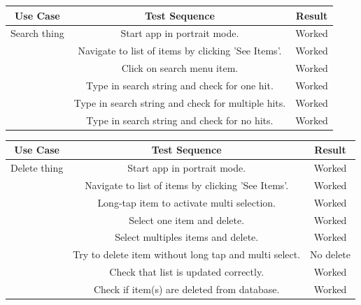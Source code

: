 \documentclass{article} %
\begin{document}

\begin{center}
 \begin{tabular}{||c c c||} 
 \hline
 Use Case & Test Sequence & Result \\ [0.5ex] 
 \hline\hline
 Search thing & Start app in portrait mode. & Worked \\ 
 \hline
 & Navigate to list of items by clicking 'See Items'. & Worked \\
 \hline
 & Click on search menu item. & Worked \\
 \hline
 & Type in search string and check for one hit. & Worked \\
 \hline
 & Type in search string and check for multiple hits. & Worked \\
 \hline
 & Type in search string and check for no hits. & Worked \\ [1ex] 
   \hline
\end{tabular}
\end{center}


\begin{center}
 \begin{tabular}{||c c c||} 
 \hline
 Use Case & Test Sequence & Result \\ [0.5ex] 
 \hline\hline
 Delete thing & Start app in portrait mode. & Worked \\ 
 \hline
 & Navigate to list of items by clicking 'See Items'. & Worked \\
 \hline
 & Long-tap item to activate multi selection. & Worked \\
 \hline
 & Select one item and delete. & Worked \\
 \hline
 & Select multiples items and delete. & Worked \\
 \hline
 & Try to delete item without long tap and multi select. & No delete \\
 \hline
 & Check that list is updated correctly. & Worked \\
 \hline
 & Check if item(s) are deleted from database. & Worked \\ [1ex] 
   \hline
\end{tabular}
\end{center}

\end{document}

